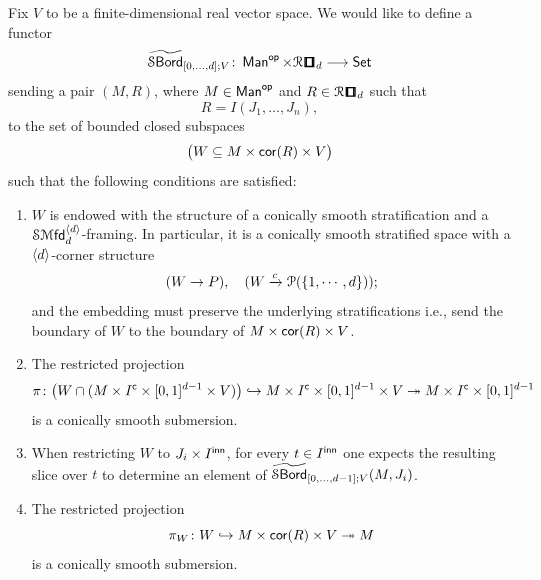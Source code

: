 \begin{construction}\label{fo:: def: higher strat bord}
     Fix $V$ to be a finite-dimensional real vector space. We would like to define a functor 
    \begin{equation}
    \tilbordstr_{[0,\ldots,d];V}\maps \man^{\op}\times \cR\cube_{d} \longrightarrow \set    
    \end{equation}
    sending a pair $(M,R)$, where $M  \in \operatorname{\sf Man}^{\mathsf{op}}$ and $R\in \cR\cube_d$ such that 
    \begin{equation}
        R = I(J_1, \ldots, J_n),
    \end{equation} 
    to the set of bounded closed subspaces 
    \begin{equation}
   \big( W\subseteq M\times \operatorname{{\sf cor}}(R) \times V \big)
    \end{equation} 
    such that the following conditions are satisfied:
    \begin{enumerate}
    \item \label{id: cor 1} $W$ is endowed with the structure of a conically smooth stratification and a ${\mathcal S\!\operatorname{{\mathcal M}\mathsf{fd}}}_{d}^{\langle d \rangle}$-framing. In particular, it is a conically smooth stratified space with a $\langle d \rangle$-corner structure
    \begin{equation}
         (W \rightarrow P),\quad (W \xrightarrow{c} \mathcal P(\{1,\cdots,d\}));
    \end{equation} 
    and the embedding must preserve the underlying stratifications i.e., send the boundary of $W$ to the boundary of $M\times \operatorname{{\sf cor}}(R) \times V$.
    \item \label{id: cor 2} The restricted projection 
    \begin{equation}
        \pi\colon \big(W \cap (M\times I^{\mathsf{c}}\times [0,1]^{d-1} \times V) \big) \hookrightarrow M\times I^{\mathsf{c}}\times [0,1]^{d-1} \times V \twoheadrightarrow  M\times I^{\mathsf{c}}\times [0,1]^{d-1}
    \end{equation} 
    is a conically smooth submersion.
    \item \label{id: cor 3} When restricting $W$ to $J_{i} \times I^{\sf inn}$, for every $t\in I^{\sf inn}$ one expects the resulting slice over $t$ to determine an element of $\operatorname{\widetilde{\mathcal S\mathsf{Bord}}}_{[0,\ldots,d-1];V}(M,J_{i})$.
    \item \label{id: cor 4} The restricted projection 
    \begin{equation}
    \pi_W\colon W \hookrightarrow M\times \operatorname{{\sf cor}}(R) \times V \twoheadrightarrow M 
    \end{equation}
    is a conically smooth submersion.
    \end{enumerate} 


\end{construction}
